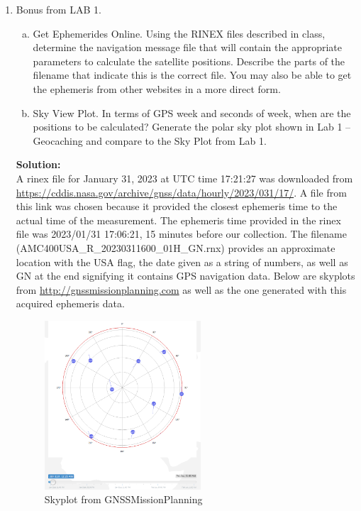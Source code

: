 \documentclass[11pt]{article}
\newcommand{\solution}{\textbf{Solution: \\}}
\begin{document}
\begin{enumerate}[label=\textbf{\arabic*.}]
  \item Bonus from LAB 1.
  \begin{enumerate}[(a)]
    \itemsep = -2pt
    \item Get Ephemerides Online. Using the RINEX files described in class, determine
    the navigation message file that will contain the appropriate parameters to
    calculate the satellite positions. Describe the parts of the filename that indicate
    this is the correct file. You may also be able to get the ephemeris from other
    websites in a more direct form.
    \item Sky View Plot. In terms of GPS week and seconds of week, when are the
    positions to be calculated? Generate the polar sky plot shown in Lab 1 –
    Geocaching and compare to the Sky Plot from Lab 1.
  \end{enumerate}
  \solution 
  A rinex file for January 31, 2023 at UTC time 17:21:27 was downloaded from 
  \url{https://cddis.nasa.gov/archive/gnss/data/hourly/2023/031/17/}. A file 
  from this link was chosen because it provided the closest ephemeris time to 
  the actual time of the measurement. The ephemeris time provided in the rinex 
  file was 2023/01/31 17:06:21, 15 minutes before our collection. The filename 
  (AMC400USA\_R\_20230311600\_01H\_GN.rnx) provides an approximate location with the 
  USA flag, the date given as a string of numbers, as well as GN at the end 
  signifying it contains GPS navigation data. Below are skyplots from 
  \url{http://gnssmissionplanning.com} as well as the one generated with this 
  acquired ephemeris data.
  \begin{figure}[H]
    \centering
    \includegraphics[width=0.55\textwidth]{mission_sky_1120.png}
    \caption{Skyplot from GNSSMissionPlanning}
  \end{figure}

\end{enumerate}
\end{document}
